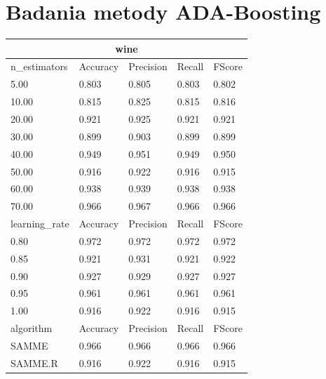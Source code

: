\documentclass[12pt,a4paper]{article}
\begin{document}
\section{Badania metody ADA-Boosting}
\begin{tabular}{ |p{3cm}||p{2cm}|p{2cm}|p{2cm}|p{2cm}| }
\hline
\multicolumn{5}{|c|}{wine}\\
\hline
n\_estimators & Accuracy & Precision & Recall & FScore \\
\hline
5.00 & 0.803 & 0.805 & 0.803 & 0.802\\
10.00 & 0.815 & 0.825 & 0.815 & 0.816\\
20.00 & 0.921 & 0.925 & 0.921 & 0.921\\
30.00 & 0.899 & 0.903 & 0.899 & 0.899\\
40.00 & 0.949 & 0.951 & 0.949 & 0.950\\
50.00 & 0.916 & 0.922 & 0.916 & 0.915\\
60.00 & 0.938 & 0.939 & 0.938 & 0.938\\
70.00 & 0.966 & 0.967 & 0.966 & 0.966\\
\hline
learning\_rate & Accuracy & Precision & Recall & FScore \\
\hline
0.80 & 0.972 & 0.972 & 0.972 & 0.972\\
0.85 & 0.921 & 0.931 & 0.921 & 0.922\\
0.90 & 0.927 & 0.929 & 0.927 & 0.927\\
0.95 & 0.961 & 0.961 & 0.961 & 0.961\\
1.00 & 0.916 & 0.922 & 0.916 & 0.915\\
\hline
algorithm & Accuracy & Precision & Recall & FScore \\
\hline
SAMME & 0.966 & 0.966 & 0.966 & 0.966\\
SAMME.R & 0.916 & 0.922 & 0.916 & 0.915\\
\hline
\end{tabular}
\end{document}
